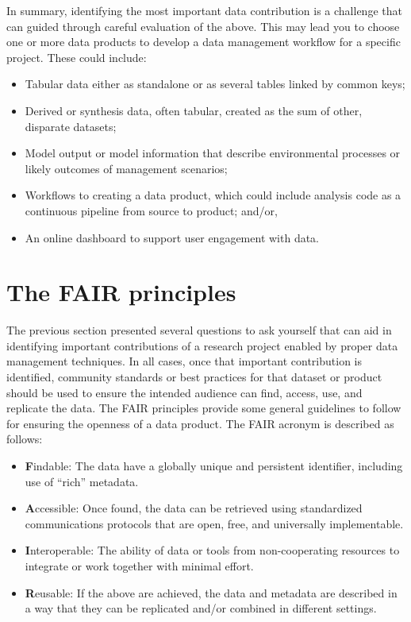 \documentclass[
]{book}
\providecommand{\tightlist}{%
  \setlength{\itemsep}{0pt}\setlength{\parskip}{0pt}}
\begin{document}
In summary, identifying the most important data contribution is a challenge that can guided through careful evaluation of the above. This may lead you to choose one or more data products to develop a data management workflow for a specific project. These could include:

\begin{itemize}
\tightlist
\item
  Tabular data either as standalone or as several tables linked by common keys;
\item
  Derived or synthesis data, often tabular, created as the sum of other, disparate datasets;
\item
  Model output or model information that describe environmental processes or likely outcomes of management scenarios;
\item
  Workflows to creating a data product, which could include analysis code as a continuous pipeline from source to product; and/or,
\item
  An online dashboard to support user engagement with data.
\end{itemize}

\section{The FAIR principles}\label{fair}

The previous section presented several questions to ask yourself that can aid in identifying important contributions of a research project enabled by proper data management techniques. In all cases, once that important contribution is identified, community standards or best practices for that dataset or product should be used to ensure the intended audience can find, access, use, and replicate the data. The FAIR principles \citep{Wilkinson16} provide some general guidelines to follow for ensuring the openness of a data product. The FAIR acronym is described as follows:

\begin{itemize}
\tightlist
\item
  \textbf{F}indable: The data have a globally unique and persistent identifier, including use of ``rich'' metadata.
\item
  \textbf{A}ccessible: Once found, the data can be retrieved using standardized communications protocols that are open, free, and universally implementable.
\item
  \textbf{I}nteroperable: The ability of data or tools from non-cooperating resources to integrate or work together with minimal effort.
\item
  \textbf{R}eusable: If the above are achieved, the data and metadata are described in a way that they can be replicated and/or combined in different settings.
\end{itemize}
\end{document}
